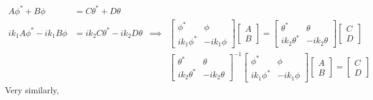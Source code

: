 \documentclass[letter, 10pts]{article}
\begin{document}
\begin{align*}
	A \phi^{*} + B \phi &= C \theta^{*} + D \theta \\
	i k_1 A \phi^{*}  - i k_1 B \phi &= i k_2 C \theta^{*} - i k_2 D \theta  
					 &
	\implies 
					 &
	\begin{bmatrix} \phi^{*} & \phi \\ 
	i k_1 \phi^{*} & - i k_1 \phi\end{bmatrix} 
		\begin{bmatrix} A \\ B \end{bmatrix}  
	=
		\begin{bmatrix} \theta^{*} & \theta \\ 
		i k_2 \theta^{*} & - i k_2 \theta\end{bmatrix} 
		\begin{bmatrix} C \\ D \end{bmatrix}  
					\\ &  
					 &
					 &
		\begin{bmatrix} \theta^{*} & \theta \\ 
		i k_2 \theta^{*} & - i k_2 \theta\end{bmatrix}^{-1} 
	\begin{bmatrix} \phi^{*} & \phi \\ 
	i k_1 \phi^{*} & - i k_1 \phi\end{bmatrix} 
		\begin{bmatrix} A \\ B \end{bmatrix} 
	=
		\begin{bmatrix} C \\ D \end{bmatrix}  
\end{align*}
Very similarly, 
\end{document}
